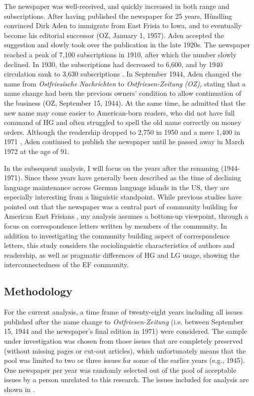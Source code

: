 \documentclass[output=paper]{langsci/langscibook}
\begin{document}
The newspaper was well-received, and quickly increased in both range and subscriptions. After having published the newspaper for 25 years, Hündling convinced Dirk Aden to immigrate from East Frisia to Iowa, and to eventually become his editorial successor (OZ, January 1, 1957). Aden accepted the suggestion and slowly took over the publication in the late 1920s. The newspaper reached a peak of 7,100 subscriptions in 1910, after which the number slowly declined. In 1930, the subscriptions had decreased to 6,600, and by 1940 circulation sank to 3,630 subscriptions \citep[79]{Lindaman2004}. In September 1944, Aden changed the name from \textit{Ostfriesische} \textit{Nachrichten} to \textit{Ostfriesen-Zeitung} \textit{(OZ),} stating that a name change had been the previous owners’ condition to allow continuation of the business (OZ, September 15, 1944). At the same time, he admitted that the new name may come easier to American-born readers, who did not have full command of HG and often struggled to spell the old name correctly on money orders. Although the readership dropped to 2,750 in 1950 \citep[79]{Lindaman2004} and a mere 1,400 in 1971 \citep{Monahan1971}, Aden continued to publish the newspaper until he passed away in March 1972 at the age of 91.

In the subsequent analysis, I will focus on the years after the renaming (1944-1971). Since these years have generally been described as the time of declining language maintenance across German language islands in the US, they are especially interesting from a linguistic standpoint. While previous studies have pointed out that the newspaper was a central part of community building for American East Frisians \citep{Lindaman2002,Lindaman2004}, my analysis assumes a bottom-up viewpoint, through a focus on correspondence letters written by members of the community. In addition to investigating the community building aspect of correspondence letters, this study considers the sociolinguistic characteristics of authors and readership, as well as pragmatic differences of HG and LG usage, showing the interconnectedness of the EF community.

\subsection{Methodology} %
\label{sec:rocker:}

For the current analysis, a time frame of twenty-eight years including all issues published after the name change to \textit{Ostfriesen-Zeitung} (i.e. between September 15, 1944 and the newspaper’s final edition in 1971) were considered. The sample under investigation was chosen from those issues that are completely preserved (without missing pages or cut-out articles), which unfortunately means that the pool was limited to two or three issues for some of the earlier years (e.g., 1945). One newspaper per year was randomly selected out of the pool of acceptable issues by a person unrelated to this research. The issues included for analysis are shown in . 
 
\end{document}
